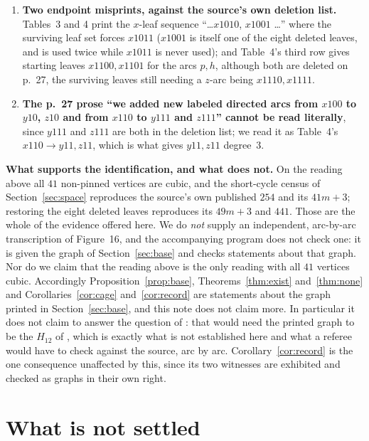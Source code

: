 \documentclass[11pt]{amsart}
\theoremstyle{remark}
\begin{document}
\begin{enumerate}
\item \textbf{Two endpoint misprints, against the source's own deletion list.} Tables~3 and 4
print the $x$-leaf sequence ``\dots $x1010$, $x1001$ \dots'' where the surviving leaf set forces
$x1011$ ($x1001$ is itself one of the eight deleted leaves, and is used twice while $x1011$ is
never used); and Table~4's third row gives starting leaves $x1100,x1101$ for the arcs $p,h$,
although both are deleted on p.~27, the surviving leaves still needing a $z$-arc being
$x1110,x1111$.
\item \textbf{The p.~27 prose ``we added new labeled directed arcs from $x100$ to $y10$, $z10$
and from $x110$ to $y111$ and $z111$'' cannot be read literally}, since $y111$ and $z111$ are
both in the deletion list; we read it as Table~4's $x110\to y11,z11$, which is what gives
$y11,z11$ degree~$3$.
\end{enumerate}

\noindent\textbf{What supports the identification, and what does not.} On the reading above all
$41$ non-pinned vertices are cubic, and the short-cycle census of Section~\ref{sec:space}
reproduces the source's own published $254$ and its $41m+3$; restoring the eight deleted leaves
reproduces its $49m+3$ and $441$. Those are the whole of the evidence offered here. We do
\emph{not} supply an independent, arc-by-arc transcription of Figure~16, and the accompanying
program does not check one: it is given the graph of Section~\ref{sec:base} and checks
statements about that graph. Nor do we claim that the reading above is the only reading with all
$41$ vertices cubic. Accordingly Proposition~\ref{prop:base},
Theorems~\ref{thm:exist} and~\ref{thm:none} and Corollaries~\ref{cor:cage}
and~\ref{cor:record} are statements about the graph printed in Section~\ref{sec:base}, and this
note does not claim more. In particular it does not claim to answer the question of \cite{AAB}:
that would need the printed graph to be the $H_{12}$ of \cite[Figure~16]{AAB}, which is exactly
what is not established here and what a referee would have to check against the source, arc by
arc. Corollary~\ref{cor:record} is the one consequence unaffected by this, since its two
witnesses are exhibited and checked as graphs in their own right.

\section{What is not settled}\label{sec:open}
\end{document}
